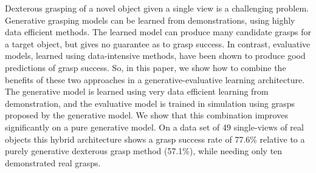 Dexterous grasping of a novel object given a single view is a challenging problem. Generative grasping models can be learned from demonstrations, using highly data efficient methods. The learned model can produce many candidate grasps for a target object, but gives no guarantee as to grasp success. In contrast, evaluative models, learned using data-intensive methods, have been shown to produce good predictions of grasp success. So, in this paper, we show how to combine the benefits of these two approaches in a generative-evaluative learning architecture. The generative model is learned using very data efficient learning from demonstration, and the evaluative model is trained in simulation using grasps proposed by the generative model. We show that this combination improves significantly on a pure generative model. On a data set of 49 single-views of real objects this hybrid architecture shows a grasp success rate of 77.6\% relative to a purely generative dexterous grasp method (57.1\%), while needing only ten demonstrated real grasps.